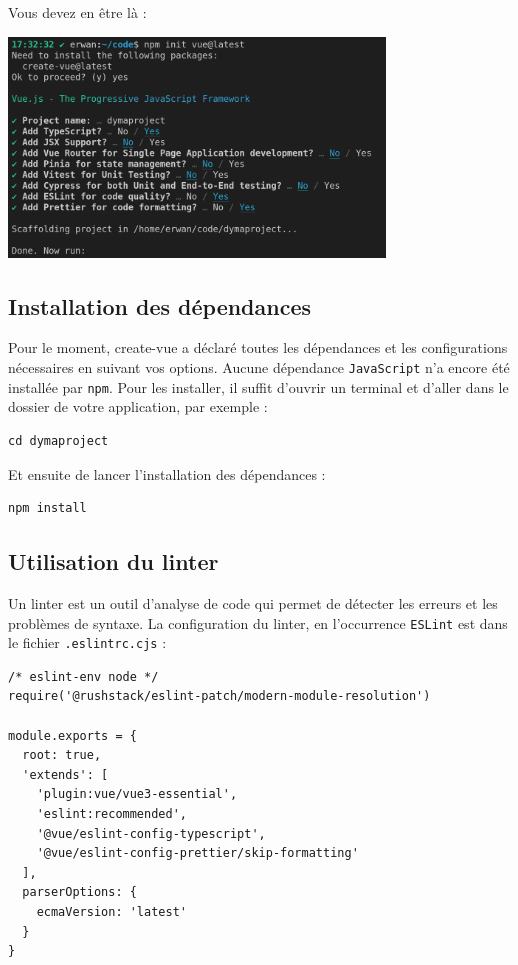 Vous devez en être là :
\begin{center}
\includegraphics[width=10cm]{images/image04.png}
\end{center}

\subsection{Installation des dépendances}
Pour le moment, {\color{monOrange}create-vue} a déclaré toutes les dépendances et les configurations nécessaires en suivant vos options. Aucune dépendance {\tt JavaScript} n'a encore été installée par {\tt npm}. Pour les installer, il suffit d'ouvrir un terminal et d'aller dans le dossier de votre application, par exemple :
\begin{verbatim}
cd dymaproject
\end{verbatim}

Et ensuite de lancer l'installation des dépendances :
\begin{verbatim}
npm install
\end{verbatim}

\subsection{Utilisation du linter}
Un linter est un outil d'analyse de code qui permet de détecter les erreurs et les problèmes de syntaxe. La configuration du linter, en l'occurrence {\tt ESLint} est dans le fichier {\tt .eslintrc.cjs} :
\begin{verbatim}
/* eslint-env node */
require('@rushstack/eslint-patch/modern-module-resolution')

module.exports = {
  root: true,
  'extends': [
    'plugin:vue/vue3-essential',
    'eslint:recommended',
    '@vue/eslint-config-typescript',
    '@vue/eslint-config-prettier/skip-formatting'
  ],
  parserOptions: {
    ecmaVersion: 'latest'
  }
}
\end{verbatim}

